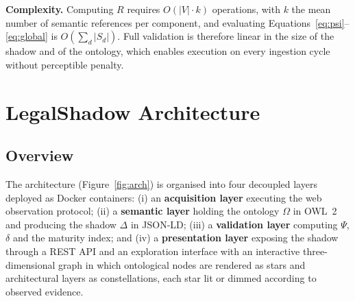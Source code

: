 \documentclass[engproc,article,submit,moreauthors]{Definitions/mdpi}
\begin{document}
\textbf{Complexity.} Computing $R$ requires $O(|V| \cdot k)$ operations, with $k$ the mean number of semantic references per component, and evaluating Equations~\eqref{eq:psi}--\eqref{eq:global} is $O(\sum_d |S_d|)$. Full validation is therefore linear in the size of the shadow and of the ontology, which enables execution on every ingestion cycle without perceptible penalty.

\section{LegalShadow Architecture}
\label{sec:arch}

\subsection{Overview}
The architecture (Figure~\ref{fig:arch}) is organised into four decoupled layers deployed as Docker containers: (i) an \textbf{acquisition layer} executing the web observation protocol; (ii) a \textbf{semantic layer} holding the ontology $\Omega$ in OWL~2 and producing the shadow $\Delta$ in JSON-LD; (iii) a \textbf{validation layer} computing $\Psi$, $\delta$ and the maturity index; and (iv) a \textbf{presentation layer} exposing the shadow through a REST API and an exploration interface with an interactive three-dimensional graph in which ontological nodes are rendered as stars and architectural layers as constellations, each star lit or dimmed according to observed evidence.
\end{document}
